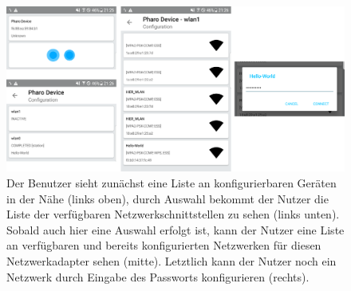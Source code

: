 \begin{leveldown}
    \begin{figure}[ht]
		\centering
	    \includegraphics[width=1.0\textwidth]{../latex-ai-project/user_flow.png}
    	\caption[]{Der Benutzer sieht zunächst eine Liste an konfigurierbaren Geräten in der Nähe (links oben), durch Auswahl bekommt der Nutzer die Liste der verfügbaren Netzwerkschnittstellen zu sehen (links unten). Sobald auch hier eine Auswahl erfolgt ist, kann der Nutzer eine Liste an verfügbaren und bereits konfigurierten Netzwerken für diesen Netzwerkadapter sehen (mitte). Letztlich kann der Nutzer noch ein Netzwerk durch Eingabe des Passworts konfigurieren (rechts). }
	    \label{user_flow}
	\end{figure}
	
	
	

\end{leveldown}
